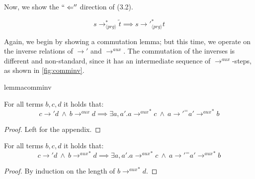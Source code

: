 Now, we show the $`` \Leftarrow ''$ direction of (3.2).

\begin{lemma}
\label{lem:prop2rl}
\[
s \longrightarrow^*_{\langle prg \rangle} \widetilde{t} \implies s {\longrightarrow'}_{\langle prg \rangle}^* t
\]
\end{lemma}

Again, we begin by showing a commutation lemma; but this time, we operate on the inverse relations of $\longrightarrow'$ and $\longrightarrow^{aux}$. The commutation of the inverses is different and non-standard, since it has an intermediate sequence of $\longrightarrow^{aux}$-steps, as shown in \autoref{fig:comminv}.

\begin{restatable}{lemma}{comminv}
\label{lem:comminv}

For all terms $b,c,d$ it holds that:
\[
c {\longrightarrow'} d ~ \land ~ b \longrightarrow^{aux} d \implies \exists a, a' . a {\longrightarrow^{aux}}^* c ~ \land ~ a {\longrightarrow'}^= a' {\longrightarrow^{aux}}^*  b
\]

\end{restatable}
\begin{proof}
Left for the appendix.
\end{proof}

\begin{corollary}
\label{cor:comminvcor}

For all terms $b,c,d$ it holds that:
\[
c \longrightarrow' d ~ \land ~ b {\longrightarrow^{aux}}^* d \implies \exists a, a' . a {\longrightarrow^{aux}}^* c ~ \land ~ a {\longrightarrow'}^= a' {\longrightarrow^{aux}}^* b
\]

\begin{proof}

By induction on the length of $b {\longrightarrow^{aux}}^* d$.

\end{proof}
\end{corollary}

